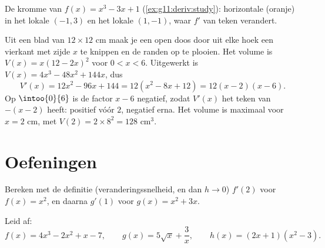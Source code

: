\begin{omfigure}

{\small De kromme van $f(x) = x^3 - 3x + 1$ (\cref{ex:g11:deriv:study}):
horizontale  (oranje) in het lokale  $(-1, 3)$ en het
lokale  $(1, -1)$, waar $f'$ van teken verandert.}
\end{omfigure}

\begin{example}[Optimalisering]\label{ex:g11:deriv:box}
Uit een blad van $12 \times 12$ cm maak je een open doos door uit elke hoek
een vierkant met zijde $x$ te knippen en de randen op te plooien. Het volume
is $V(x) = x(12 - 2x)^2$ voor $0 < x < 6$. Uitgewerkt is
$V(x) = 4x^3 - 48x^2 + 144x$, dus
\[
V'(x) = 12x^2 - 96x + 144 = 12(x^2 - 8x + 12) = 12(x - 2)(x - 6).
\]
Op $\intoo{0}{6}$ is de factor $x - 6$ negatief, zodat $V'(x)$ het teken van
$-(x-2)$ heeft: positief vóór $2$, negatief erna. Het volume is maximaal
voor $x = 2$ cm, met $V(2) = 2 \times 8^2 = 128$ cm$^3$.
\end{example}

\section{Oefeningen}

\begin{exercise}[$\star$]\label{exo:g11:deriv:1}
Bereken met de definitie (veranderingssnelheid, en dan $h \to 0$) $f'(2)$
voor $f(x) = x^2$, en daarna $g'(1)$ voor $g(x) = x^2 + 3x$.
\end{exercise}

\begin{exercise}[$\star$]\label{exo:g11:deriv:2}
Leid af:
\[
f(x) = 4x^3 - 2x^2 + x - 7, \qquad
g(x) = 5\sqrt{x} + \frac{3}{x}, \qquad
h(x) = (2x+1)(x^2 - 3) .
\]
\end{exercise}

